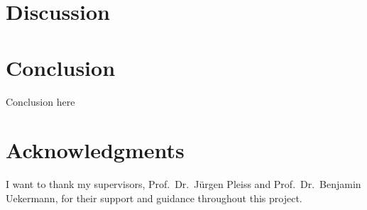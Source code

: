 \documentclass[lettersize,journal]{IEEEtran}
\begin{document}
 \section{Discussion}\label{sec:discussion}
 


 \section{Conclusion}\label{sec:conclusion} %

Conclusion here



\section*{Acknowledgments}
I want to thank my supervisors, Prof.\ Dr.\ Jürgen Pleiss and Prof.\ Dr.\ Benjamin Uekermann, for their support and guidance throughout this project.


 
 





%
%

%
\end{document}
